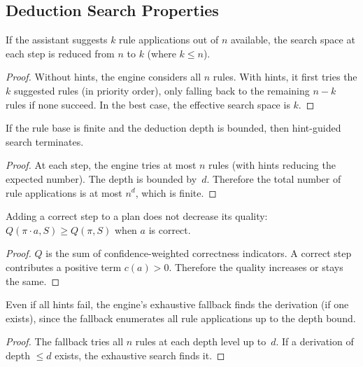 \documentclass[11pt]{article}
\begin{document}
\subsection{Deduction Search Properties}

\begin{lemma}%
\label{lem:searchhint}
If the assistant suggests $k$ rule applications out of $n$
available, the search space at each step is reduced from $n$
to $k$ (where $k \leq n$).
\end{lemma}
\begin{proof}
Without hints, the engine considers all $n$ rules.  With
hints, it first tries the $k$ suggested rules (in priority
order), only falling back to the remaining $n - k$ rules
if none succeed.  In the best case, the effective search
space is $k$.
\end{proof}

\begin{lemma}%
\label{lem:hintsearchterm}
If the rule base is finite and the deduction depth is bounded,
then hint-guided search terminates.
\end{lemma}
\begin{proof}
At each step, the engine tries at most $n$ rules (with hints
reducing the expected number).  The depth is bounded by~$d$.
Therefore the total number of rule applications is at most
$n^d$, which is finite.
\end{proof}

\begin{lemma}%
\label{lem:planqualmono}
Adding a correct step to a plan does not decrease its quality:
$Q(\pi \cdot a, S) \geq Q(\pi, S)$ when $a$ is correct.
\end{lemma}
\begin{proof}
$Q$ is the sum of confidence-weighted correctness indicators.
A correct step contributes a positive term $c(a) > 0$.
Therefore the quality increases or stays the same.
\end{proof}

\begin{lemma}%
\label{lem:fallbackcomp}
Even if all hints fail, the engine's exhaustive fallback
finds the derivation (if one exists), since the fallback
enumerates all rule applications up to the depth bound.
\end{lemma}
\begin{proof}
The fallback tries all $n$ rules at each depth level up
to~$d$.  If a derivation of depth $\leq d$ exists, the
exhaustive search finds it.
\end{proof}
\end{document}
